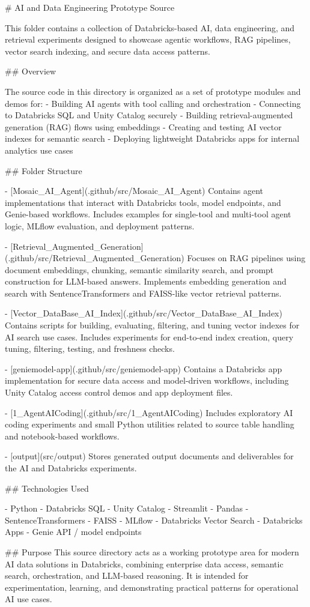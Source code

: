 # AI and Data Engineering Prototype Source

This folder contains a collection of Databricks-based AI, data engineering, and retrieval experiments designed to showcase agentic workflows, RAG pipelines, vector search indexing, and secure data access patterns.

## Overview

The source code in this directory is organized as a set of prototype modules and demos for:
- Building AI agents with tool calling and orchestration
- Connecting to Databricks SQL and Unity Catalog securely
- Building retrieval-augmented generation (RAG) flows using embeddings
- Creating and testing AI vector indexes for semantic search
- Deploying lightweight Databricks apps for internal analytics use cases

## Folder Structure

- [Mosaic_AI_Agent](.github/src/Mosaic_AI_Agent)  
  Contains agent implementations that interact with Databricks tools, model endpoints, and Genie-based workflows. Includes examples for single-tool and multi-tool agent logic, MLflow evaluation, and deployment patterns.

- [Retrieval_Augmented_Generation](.github/src/Retrieval_Augmented_Generation)  
  Focuses on RAG pipelines using document embeddings, chunking, semantic similarity search, and prompt construction for LLM-based answers. Implements embedding generation and search with SentenceTransformers and FAISS-like vector retrieval patterns.

- [Vector_DataBase_AI_Index](.github/src/Vector_DataBase_AI_Index)  
  Contains scripts for building, evaluating, filtering, and tuning vector indexes for AI search use cases. Includes experiments for end-to-end index creation, query tuning, filtering, testing, and freshness checks.

- [geniemodel-app](.github/src/geniemodel-app)  
  Contains a Databricks app implementation for secure data access and model-driven workflows, including Unity Catalog access control demos and app deployment files.

- [1_AgentAICoding](.github/src/1_AgentAICoding)  
  Includes exploratory AI coding experiments and small Python utilities related to source table handling and notebook-based workflows.

- [output](src/output)  
  Stores generated output documents and deliverables for the AI and Databricks experiments.


## Technologies Used

- Python
- Databricks SQL
- Unity Catalog
- Streamlit
- Pandas
- SentenceTransformers
- FAISS
- MLflow
- Databricks Vector Search
- Databricks Apps
- Genie API / model endpoints

## Purpose
This source directory acts as a working prototype area for modern AI data solutions in Databricks, combining enterprise data access, semantic search, orchestration, and LLM-based reasoning. It is intended for experimentation, learning, and demonstrating practical patterns for operational AI use cases.